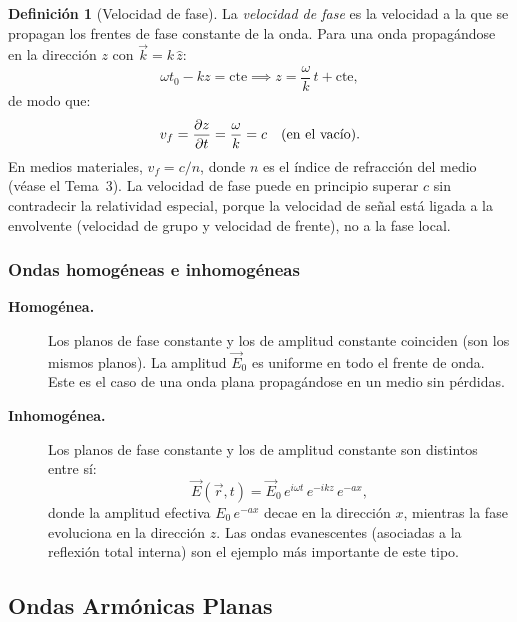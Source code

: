 \documentclass[12pt, a4paper]{article}
\theoremstyle{plain}
\theoremstyle{definition}
\newtheorem{definicion}[teorema]{Definición}
\theoremstyle{remark}
\newcommand{\ve}[1]{\vec{#1}}
\newcommand{\uvec}[1]{\hat{#1}}
\begin{document}
\begin{definicion}[Velocidad de fase]
La \emph{velocidad de fase} es la velocidad a la que se propagan los frentes
de fase constante de la onda. Para una onda propagándose en la dirección $z$
con $\ve{k} = k\,\uvec{z}$:
\[
  \omega t_0 - kz = \mathrm{cte} \implies z = \frac{\omega}{k}\,t
  + \mathrm{cte},
\]
de modo que:
\begin{equation}
  v_f = \pdv{z}{t} = \frac{\omega}{k} = c \quad(\text{en el vacío}).
  \label{eq:vfase}
\end{equation}
En medios materiales, $v_f = c/n$, donde $n$ es el índice de refracción del
medio (véase el Tema~3). La velocidad de fase puede en principio superar $c$
sin contradecir la relatividad especial, porque la velocidad de señal está
ligada a la envolvente (velocidad de grupo y velocidad de frente), no a la
fase local.
\end{definicion}

\subsubsection{Ondas homogéneas e inhomogéneas}

\begin{description}
  \item[\textbf{Homogénea.}] Los planos de fase constante y los de amplitud
        constante coinciden (son los mismos planos). La amplitud $\ve{E}_0$
        es uniforme en todo el frente de onda. Este es el caso de una onda
        plana propagándose en un medio sin pérdidas.

  \item[\textbf{Inhomogénea.}] Los planos de fase constante y los de amplitud
        constante son distintos entre sí:
        \[
          \ve{E}(\ve{r},t) = \ve{E}_0\,e^{i\omega t}\,e^{-ikz}\,e^{-ax},
        \]
        donde la amplitud efectiva $E_0\,e^{-ax}$ decae en la dirección $x$,
        mientras la fase evoluciona en la dirección $z$. Las ondas evanescentes
        (asociadas a la reflexión total interna) son el ejemplo más importante
        de este tipo.
\end{description}

\subsection{Ondas Armónicas Planas}
\end{document}
